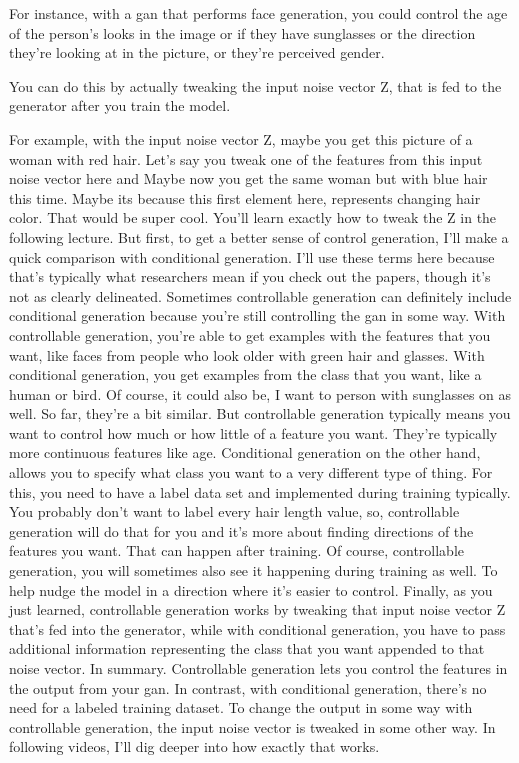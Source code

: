 \documentclass[11pt, onecolumn]{article}
\begin{document}
For instance, with a gan that performs face generation, you could control the age of
the person's looks in the image or if they have sunglasses or the direction they're looking at in the picture,
or they're perceived gender.

You can do this by actually
tweaking the input noise vector Z,
that is fed to the generator after you train the model.

For example, with the input noise vector Z,
maybe you get this picture of a woman with red hair.
Let's say you tweak one of
the features from this input noise vector
here and Maybe now you get
the same woman but with blue hair this time.
Maybe its because this first element here,
represents changing hair color.
That would be super cool.
You'll learn exactly how to
tweak the Z in the following lecture.
But first, to get a better sense of control generation,
I'll make a quick comparison with conditional generation.
I'll use these terms here because that's typically
what researchers mean if you check out the papers,
though it's not as clearly delineated.
Sometimes controllable generation can definitely include
conditional generation because you're still
controlling the gan in some way.
With controllable generation, you're able to
get examples with the features that you want,
like faces from people who look
older with green hair and glasses.
With conditional generation, you get
examples from the class that you want,
like a human or bird.
Of course, it could also be,
I want to person with sunglasses on as well.
So far, they're a bit similar.
But controllable generation typically means you want to
control how much or how little of a feature you want.
They're typically more continuous features like age.
Conditional generation on the other hand,
allows you to specify what class you
want to a very different type of thing.
For this, you need to have a label data set
and implemented during training typically.
You probably don't want to label
every hair length value, so,
controllable generation will do that for you and it's
more about finding directions of the features you want.
That can happen after training.
Of course, controllable generation,
you will sometimes also see it
happening during training as well.
To help nudge the model in
a direction where it's easier to control.
Finally, as you just learned,
controllable generation works by tweaking
that input noise vector Z that's fed into the generator,
while with conditional generation,
you have to pass additional information representing
the class that you want appended to that noise vector.
In summary. Controllable generation lets you
control the features in the output from your gan.
In contrast, with conditional generation,
there's no need for a labeled training dataset.
To change the output in some way
with controllable generation,
the input noise vector is tweaked in some other way.
In following videos, I'll dig deeper
into how exactly that works. 
\end{document}
